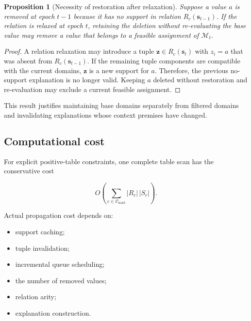 \documentclass[pdflatex,sn-mathphys-num,iicol,oneside]{sn-jnl}
\newtheorem{proposition}{Proposition}
\begin{document}
\begin{proposition}[Necessity of restoration after relaxation]
Suppose a value $a$ is removed at epoch $t-1$ because it has no
support in relation $R_c(\bm{s}_{t-1})$. If the relation is relaxed at
epoch $t$, retaining the deletion without re-evaluating the base value
may remove a value that belongs to a feasible assignment of
$\mathcal{M}_t$.
\end{proposition}

\begin{proof}
A relation relaxation may introduce a tuple
$\bm{z}\in R_c(\bm{s}_t)$ with $z_i=a$ that was absent from
$R_c(\bm{s}_{t-1})$. If the remaining tuple components are compatible
with the current domains, $\bm{z}$ is a new support for $a$.
Therefore, the previous no-support explanation is no longer valid.
Keeping $a$ deleted without restoration and re-evaluation may exclude
a current feasible assignment.
\end{proof}

This result justifies maintaining base domains separately from
filtered domains and invalidating explanations whose context premises
have changed.

\subsection{Computational cost}

For explicit positive-table constraints, one complete table scan has
the conservative cost

\begin{equation}
O\left(
\sum_{c\in\mathcal{C}_{\mathrm{hard}}}
|R_c|\,|S_c|
\right).
\label{eq:gac-cost}
\end{equation}

Actual propagation cost depends on:

\begin{itemize}
    \item support caching;
    \item tuple invalidation;
    \item incremental queue scheduling;
    \item the number of removed values;
    \item relation arity;
    \item explanation construction.
\end{itemize}
\end{document}
